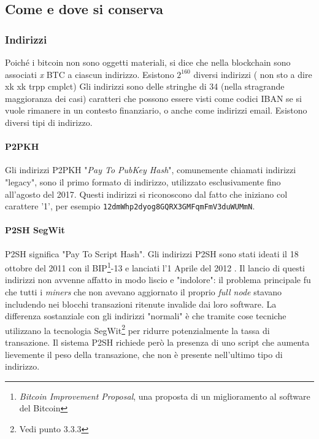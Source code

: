 \documentclass {article}
\begin{document}
\subsection {Come e dove si conserva}


\subsubsection {Indirizzi}


Poiché i bitcoin non sono oggetti materiali, si dice che nella blockchain sono associati \textit{x} BTC a ciascun indirizzo.
Esistono $2^{160}$ diversi indirizzi ( non sto a dire xk xk trpp cmplct)
Gli indirizzi sono delle stringhe di 34 (nella stragrande maggioranza dei casi) caratteri che possono essere visti come codici IBAN se si vuole rimanere in un contesto finanziario, o anche come indirizzi email.
Esistono diversi tipi di indirizzo.

\paragraph {P2PKH}

Gli indirizzi P2PKH "\textit{Pay To PubKey Hash}", comunemente chiamati indirizzi "legacy", sono il primo formato di indirizzo, utilizzato esclusivamente fino all'agosto del 2017.
Questi indirizzi si riconoscono dal fatto che iniziano col carattere '1', per esempio \texttt{12dmWhp2dyog8GQRX3GMFqmFmV3duWUMmN}.

\paragraph {P2SH SegWit}

P2SH significa "Pay To Script Hash".
Gli indirizzi P2SH sono stati ideati il 18 ottobre del 2011 con il BIP\footnote{\textit{Bitcoin Improvement Proposal}, una proposta di un miglioramento al software del Bitcoin}-13 e lanciati l'1 Aprile del 2012 \cite{bip13}\cite{p2sh}.
Il lancio di questi indirizzi non avvenne affatto in modo liscio e "indolore": il problema principale fu che tutti i \textit{miners} che non avevano aggiornato il proprio \textit{full node} stavano includendo nei blocchi transazioni ritenute invalide dai loro software.
La differenza sostanziale con gli indirizzi "normali" è che tramite cose tecniche utilizzano la tecnologia SegWit\footnote{Vedi punto 3.3.3} per ridurre potenzialmente la tassa di transazione.
Il sistema P2SH richiede però la presenza di uno script che aumenta lievemente il peso della transazione, che non è presente nell'ultimo tipo di indirizzo.
\end{document}
